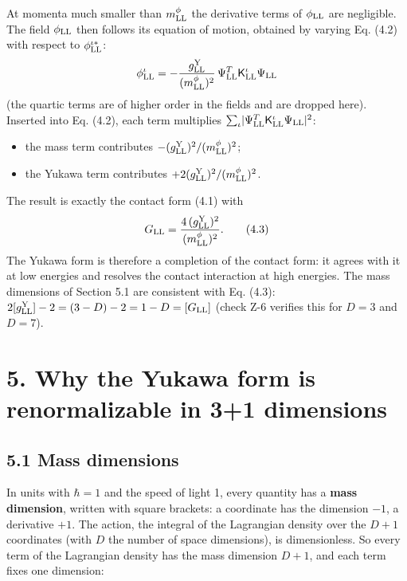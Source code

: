 \documentclass[
  10pt,
]{article}
\providecommand{\tightlist}{%
  \setlength{\itemsep}{0pt}\setlength{\parskip}{0pt}}
\begin{document}
At momenta much smaller than \(m^\phi_{\rm LL}\) the derivative terms of
\(\phi_{\rm LL}\) are negligible. The field \(\phi_{\rm LL}\) then
follows its equation of motion, obtained by varying Eq. (4.2) with
respect to \(\phi^{\iota*}_{\rm LL}\):
\[\phi^\iota_{\rm LL}=-\frac{g^{\rm Y}_{\rm LL}}{(m^\phi_{\rm LL})^2}\,\Psi^T_{\rm LL}\mathsf K^\iota_{\rm LL}\Psi_{\rm LL}\]
(the quartic terms are of higher order in the fields and are dropped
here). Inserted into Eq. (4.2), each term multiplies
\(\sum_\iota\lvert\Psi^T_{\rm LL}\mathsf K^\iota_{\rm LL}\Psi_{\rm LL}\rvert^2\):

\begin{itemize}
\tightlist
\item
  the mass term contributes
  \(-(g^{\rm Y}_{\rm LL})^2/(m^\phi_{\rm LL})^2\);
\item
  the Yukawa term contributes
  \(+2(g^{\rm Y}_{\rm LL})^2/(m^\phi_{\rm LL})^2\).
\end{itemize}

The result is exactly the contact form (4.1) with
\[G_{\rm LL}=\frac{4\,(g^{\rm Y}_{\rm LL})^2}{(m^\phi_{\rm LL})^2}. \tag{4.3}\]
The Yukawa form is therefore a completion of the contact form: it agrees
with it at low energies and resolves the contact interaction at high
energies. The mass dimensions of Section 5.1 are consistent with Eq.
(4.3): \(2[g^{\rm Y}_{\rm LL}]-2=(3-D)-2=1-D=[G_{\rm LL}]\) (check Z-6
verifies this for \(D=3\) and \(D=7\)).

\hypertarget{why-the-yukawa-form-is-renormalizable-in-31-dimensions}{%
\section{5. Why the Yukawa form is renormalizable in 3+1
dimensions}\label{why-the-yukawa-form-is-renormalizable-in-31-dimensions}}

\hypertarget{mass-dimensions}{%
\subsection{5.1 Mass dimensions}\label{mass-dimensions}}

In units with \(\hbar=1\) and the speed of light 1, every quantity has a
\textbf{mass dimension}, written with square brackets: a coordinate has
the dimension \(-1\), a derivative \(+1\). The action, the integral of
the Lagrangian density over the \(D+1\) coordinates (with \(D\) the
number of space dimensions), is dimensionless. So every term of the
Lagrangian density has the mass dimension \(D+1\), and each term fixes
one dimension:
\end{document}
